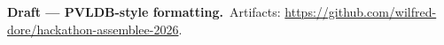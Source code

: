 \documentclass[sigconf, nonacm]{acmart}
\begin{document}
\maketitle

\begingroup\small\noindent\raggedright
\textbf{Draft --- PVLDB-style formatting.}\
Artifacts: \url{https://github.com/wilfred-dore/hackathon-assemblee-2026}.
\endgroup



























\end{document}
